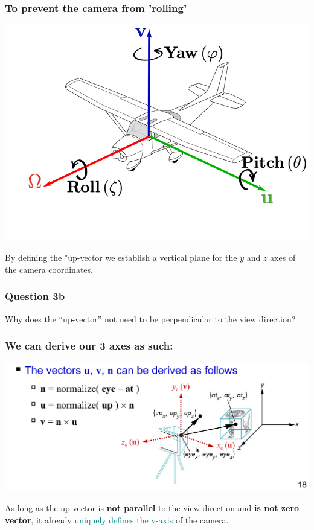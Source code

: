 \documentclass{beamer}
\begin{document}
\begin{frame}
    \frametitle{To prevent the camera from 'rolling'}

    \begin{center}
        \includegraphics[scale=0.3]{yaw-pitch-roll.png}
    \end{center}

    By defining the "up-vector  we establish a vertical plane for the $y$ and $z$ axes of the camera coordinates.
\end{frame}

\begin{frame}
    \frametitle{Question 3b}

    Why does the “up-vector” not need to be perpendicular to the view direction?

\end{frame}

\begin{frame}
    \frametitle{We can derive our 3 axes as such:}

    \begin{center}
        \includegraphics[scale=0.3]{glulookat.png}
    \end{center}

    \begin{tcolorbox}
        As long as the up-vector is \textbf{not parallel} to the view direction and 
        \textbf{is not zero vector}, it already \textcolor{teal}{uniquely defines the y-axis} of the camera.
    \end{tcolorbox}

\end{frame}
\end{document}
